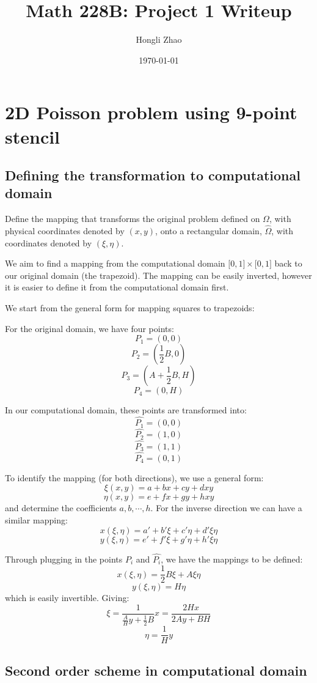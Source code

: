 \documentclass[12pt]{article}
\author{Hongli Zhao}
\title{Math 228B: Project 1 Writeup}
\date{\today}
\newcommand{\intervcc}[2]{\big[ #1, #2\big]}
\begin{document}
\maketitle
\section{2D Poisson problem using 9-point stencil}
\subsection{Defining the transformation to computational domain}

Define the mapping that transforms the original problem defined on $\Omega$, with physical coordinates denoted by $(x,y)$, onto a rectangular domain, $\hat{\Omega}$, with coordinates denoted by $(\xi,\eta)$.

We aim to find a mapping from the computational domain $\intervcc{0}{1}\times \intervcc01$ back to our original domain (the trapezoid). The mapping can be easily inverted, however it is easier to define it from the computational domain first.

We start from the general form for mapping squares to trapezoids:

For the original domain, we have four points:
$$
	P_1 = (0,0)
$$
$$
	P_2 = (\frac12 B, 0)
$$
$$
	P_3 = (A+\frac12 B,H)
$$
$$
	P_4 = (0, H)
$$	

In our computational domain, these points are transformed into:
$$
	\hat{P_1} = (0,0)
$$
$$
	\hat{P_2} = (1,0)
$$
$$
	\hat{P_3} = (1,1)
$$
$$
	\hat{P_4} = (0,1)
$$


To identify the mapping (for both directions), we use a general form:
$$
	\xi(x,y) = a + bx + cy + dxy
$$
$$
	\eta(x,y) = e + fx + gy + hxy
$$ and determine the coefficients $a,b,\cdots,h$. For the inverse direction we can have a similar mapping:
$$
	x(\xi,\eta) = a' + b'\xi + c'\eta + d'\xi\eta
$$
$$
	y(\xi,\eta) = e' + f'\xi + g'\eta + h'\xi\eta
$$

Through plugging in the points $P_i$ and $\hat{P_i}$, we have the mappings to be defined:
$$
	x(\xi,\eta)=\frac{1}{2}B\xi + A\xi\eta
$$
$$
	y(\xi,\eta) = H\eta
$$ which is easily invertible. Giving:
$$
	\xi = \frac{1}{\frac{A}{H}y + \frac{1}{2}B}x = \frac{2Hx}{2Ay+BH}
$$
$$
	\eta = \frac{1}{H}y
$$

\subsection{Second order scheme in computational domain}
\end{document}
